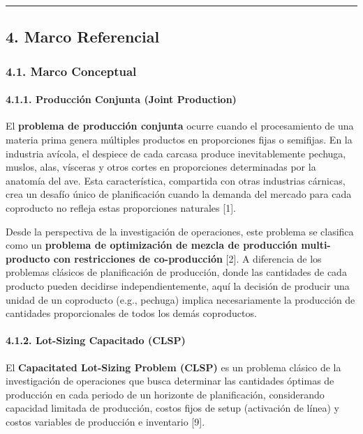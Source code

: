 \documentclass[
  spanish,
  12pt,
]{article}
\begin{document}
\begin{center}\rule{0.5\linewidth}{0.5pt}\end{center}

\subsection{4. Marco Referencial}\label{marco-referencial}

\subsubsection{4.1. Marco Conceptual}\label{marco-conceptual}

\paragraph{4.1.1. Producción Conjunta (Joint
Production)}\label{producciuxf3n-conjunta-joint-production}

El \textbf{problema de producción conjunta} ocurre cuando el
procesamiento de una materia prima genera múltiples productos en
proporciones fijas o semifijas. En la industria avícola, el despiece de
cada carcasa produce inevitablemente pechuga, muslos, alas, vísceras y
otros cortes en proporciones determinadas por la anatomía del ave. Esta
característica, compartida con otras industrias cárnicas, crea un
desafío único de planificación cuando la demanda del mercado para cada
coproducto no refleja estas proporciones naturales {[}1{]}.

Desde la perspectiva de la investigación de operaciones, este problema
se clasifica como un \textbf{problema de optimización de mezcla de
producción multi-producto con restricciones de co-producción} {[}2{]}. A
diferencia de los problemas clásicos de planificación de producción,
donde las cantidades de cada producto pueden decidirse
independientemente, aquí la decisión de producir una unidad de un
coproducto (e.g., pechuga) implica necesariamente la producción de
cantidades proporcionales de todos los demás coproductos.

\paragraph{4.1.2. Lot-Sizing Capacitado
(CLSP)}\label{lot-sizing-capacitado-clsp}

El \textbf{Capacitated Lot-Sizing Problem (CLSP)} es un problema clásico
de la investigación de operaciones que busca determinar las cantidades
óptimas de producción en cada periodo de un horizonte de planificación,
considerando capacidad limitada de producción, costos fijos de setup
(activación de línea) y costos variables de producción e inventario
{[}9{]}.
\end{document}
